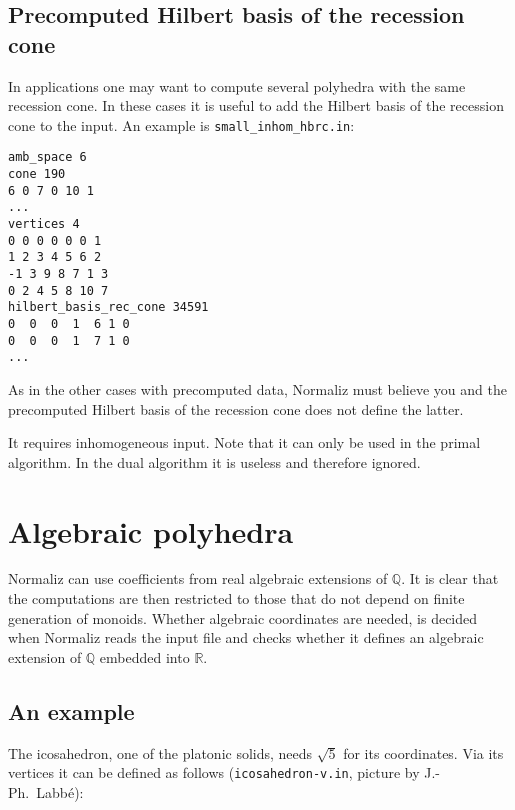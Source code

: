 \documentclass[12pt,a4paper]{scrartcl}
\theoremstyle{definition}
\def\QQ{{\mathbb Q}}
\def\RR{{\mathbb R}}
\begin{document}
\subsection{Precomputed Hilbert basis of the recession cone}\label{HB_rec_cone}

In applications one may want to compute several polyhedra with the same recession cone. In these cases it is useful to add the Hilbert basis of the recession cone to the input. An example is \verb|small_inhom_hbrc.in|:
\begin{Verbatim}
amb_space 6
cone 190
6 0 7 0 10 1
...
vertices 4
0 0 0 0 0 0 1
1 2 3 4 5 6 2
-1 3 9 8 7 1 3
0 2 4 5 8 10 7
hilbert_basis_rec_cone 34591
0  0  0  1  6 1 0
0  0  0  1  7 1 0
...
\end{Verbatim}
As in the other cases with precomputed data, Normaliz must believe you and the precomputed Hilbert basis of the recession cone does not define the latter.

It requires inhomogeneous input. Note that it can only be used in the primal algorithm. In the dual algorithm it is useless and therefore ignored.


\section{Algebraic polyhedra}\label{Algebraic}

Normaliz can use coefficients from real algebraic extensions of $\QQ$. It is clear that the computations are then restricted to those that do not depend on finite generation of monoids. Whether algebraic coordinates are needed, is decided when Normaliz reads the input file and checks whether it defines an algebraic extension of $\QQ$ embedded into $\RR$.

\subsection{An example}\label{alg_ex}

The icosahedron, one of the platonic solids, needs $\sqrt 5$ for its coordinates. Via its vertices it can be defined as follows (\verb|icosahedron-v.in|, picture by J.-Ph.~Labbé):
\end{document}
